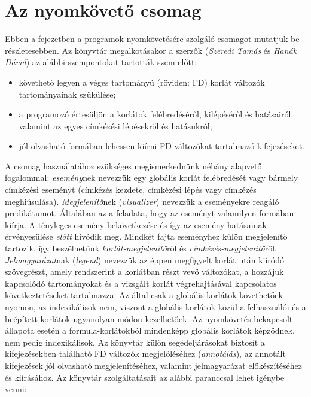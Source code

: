 \clearpage

\chapter{Az \fdbg nyomkövető csomag}

\label{fdbg}
Ebben a fejezetben a \clpfd programok nyomkövetésére szolgáló \fdbg csomagot
mutatjuk be részletesebben. Az \fdbg könyvtár megalkotásakor a szerzők
(\emph{Szeredi Tamás} és \emph{Hanák Dávid}) az alábbi szempontokat tartották
szem előtt:

\begin{itemize}
\item követhető legyen a véges tartományú (röviden: FD) korlát változók
  tartományainak szűkülése;
\item a programozó értesüljön a korlátok felébredéséről, kilépéséről és
  hatásairól, valamint az egyes címkézési lépésekről és hatásukról;
\item jól olvasható formában lehessen kiírni FD változókat tartalmazó
  kifejezéseket.
\end{itemize}

A csomag használatához szükséges megismerkednünk néhány alapvető fogalommal:
\br
{} {\em esemény}nek nevezzük egy globális korlát felébredését
vagy bármely címkézési eseményt (címkézés kezdete, címkézési lépés vagy címkézés
meghiúsulása).
\br
{} \emph{Megjelenítő}nek (\emph{visualizer}) nevezzük a \clpfd eseményekre
reagáló predikátumot. Általában az a feladata, hogy az eseményt valamilyen formában
kiírja. A tényleges esemény bekövetkezése és így az esemény hatásainak érvényesülése
\emph{előtt} hívódik meg. Mindkét fajta \clpfd eseményhez külön megjelenítő tartozik,
így beszélhetünk \emph{korlát-megjelenítő}ről és \emph{címkézés-megjelenítő}ről.
\br
{} \emph{Jelmagyarázat}nak (\emph{legend}) nevezzük az éppen megfigyelt korlát
után kiíródó szövegrészt, amely rendszerint a korlátban részt vevő változókat, a
hozzájuk kapcsolódó tartományokat és a vizsgált korlát végrehajtásával kapcsolatos
következtetéseket tartalmazza.
\br
Az \fdbg által csak a globális korlátok követhetőek nyomon, az indexikálisok nem,
viszont a globális korlátok közül a felhasználói és a beépített korlátok ugyanolyan
módon kezelhetőek. Az \fdbg nyomkövetés bekapcsolt állapota esetén a formula-korlátokból
mindenképp globális korlátok képződnek, nem pedig indexikálisok.
\br
Az \fdbg könyvtár külön segédeljárásokat biztosít a kifejezésekben található FD
változók megjelöléséhez (\emph{annotálás}), az annotált kifejezések jól olvasható
megjelenítéséhez, valamint jelmagyarázat előkészítéséhez és kiírásához.
\br
Az \fdbg könyvtár szolgáltatásait az alábbi paranccsal lehet igénybe venni:

